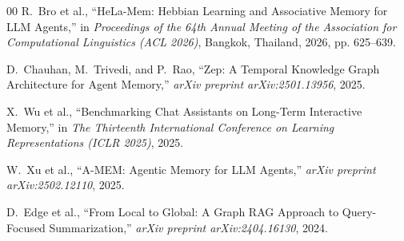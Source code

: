\documentclass[10pt,conference,twocolumn]{IEEEtran}
\begin{document}
\begin{thebibliography}{00}
R.~Bro et al., ``HeLa-Mem: Hebbian Learning and Associative Memory for LLM Agents,'' in \textit{Proceedings of the 64th Annual Meeting of the Association for Computational Linguistics (ACL 2026)}, Bangkok, Thailand, 2026, pp. 625--639.

D.~Chauhan, M.~Trivedi, and P.~Rao, ``Zep: A Temporal Knowledge Graph Architecture for Agent Memory,'' \textit{arXiv preprint arXiv:2501.13956}, 2025.

X.~Wu et al., ``Benchmarking Chat Assistants on Long-Term Interactive Memory,'' in \textit{The Thirteenth International Conference on Learning Representations (ICLR 2025)}, 2025.

W.~Xu et al., ``A-MEM: Agentic Memory for LLM Agents,'' \textit{arXiv preprint arXiv:2502.12110}, 2025.

D.~Edge et al., ``From Local to Global: A Graph RAG Approach to Query-Focused Summarization,'' \textit{arXiv preprint arXiv:2404.16130}, 2024.
\end{thebibliography}
\end{document}
